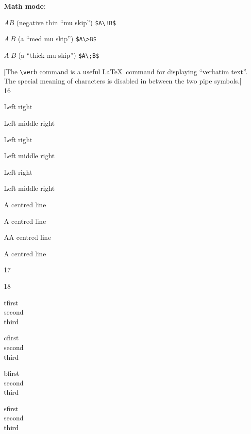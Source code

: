 \documentclass{article} %
\begin{document}
\bigskip\textbf{Math mode:}

$A\!B$ (negative thin ``mu skip'') \verb|$A\!B$|

$A\>B$ (a ``med mu skip'')  \verb|$A\>B$|

$A\;B$ (a ``thick mu skip'') \verb|$A\;B$|

[The \verb|\verb| command is a useful \LaTeX\ command for displaying 
``verbatim text''. The special meaning of characters is disabled 
in between the two pipe symbols.]\\

16

Left \hfill right

Left \hfill middle \hfill right

Left \dotfill right

Left \dotfill middle \dotfill right

Left \hrulefill right

Left \hrulefill middle \hrulefill right

\centerline{A centred line}

\hfil A centred line\hfil

\noindent\hfil AA centred line\hfil

\begin{center}A centred line\end{center}

17



18


  \begin{center}
	\begin{minipage}[t][20mm]{0.24\textwidth}
		tfirst\\ second\\ third
	\end{minipage} 

	\begin{minipage}[c][20mm]{0.24\textwidth}
		cfirst\\ second\\ third
	\end{minipage} 

	\begin{minipage}[b][20mm]{0.24\textwidth}
		bfirst\\ second\\ third
	\end{minipage} 

	\begin{minipage}[s][20mm]{0.24\textwidth}
		sfirst\\ second\\ third
	\end{minipage}   
\end{center}
\end{document}
